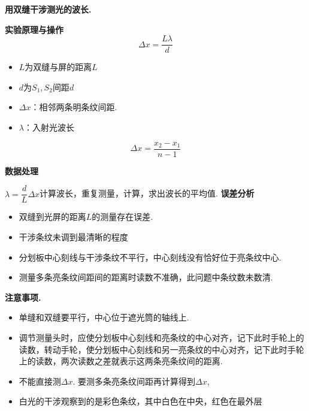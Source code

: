 \textbf{用双缝干涉测光的波长.}

\textbf{实验原理与操作}
\[ \Delta x=\frac{L\lambda}{d} \]
\begin{itemize}
\item $L$为双缝与屏的距离$L$
\item $d$为$S_1,S_2$间距$d$
\item $\Delta x$：相邻两条明条纹间距.
\item $\lambda$：入射光波长
\end{itemize}
\[ \Delta x=\frac{x_2-x_1}{n-1} \]

\textbf{数据处理}

$\lambda=\dfrac{d}{L}\Delta x$\quad 计算波长，重复测量，计算，求出波长的平均值.
\textbf{误差分析}
\begin{itemize}
\item 双缝到光屏的距离$L$的测量存在误差.
\item 干涉条纹未调到最清晰的程度
\item 分划板中心刻线与干涉条纹不平行，中心刻线没有恰好位于亮条纹中心.
\item 测量多条亮条纹间距间的距离时读数不准确，此问题中条纹数未数清. %
\end{itemize}

\textbf{注意事项.}
\begin{itemize}
\item 单缝和双缝要平行，中心位于遮光筒的轴线上.
\item 调节测量头时，应使分划板中心刻线和亮条纹的中心对齐，记下此时手轮上的读数，转动手轮，使分划板中心刻线和另一亮条纹的中心对齐，记下此时手轮上的读数，两次读数之差就表示这两条亮条纹间的距离.
\item 不能直接测$\Delta x$. 要测多条亮条纹间距再计算得到$\Delta x$,
\item 白光的干涉观察到的是彩色条纹，其中白色在中央，红色在最外层
\end{itemize}
